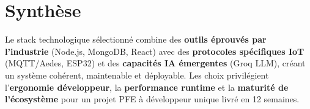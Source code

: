 \section{Synthèse}

Le stack technologique sélectionné combine des \textbf{outils éprouvés par l'industrie}
(Node.js, MongoDB, React) avec des \textbf{protocoles spécifiques IoT} (MQTT/Aedes, ESP32)
et des \textbf{capacités IA émergentes} (Groq LLM), créant un système cohérent,
maintenable et déployable. Les choix privilégient l'\textbf{ergonomie développeur},
la \textbf{performance runtime} et la \textbf{maturité de l'écosystème} pour un projet PFE
à développeur unique livré en 12 semaines.

